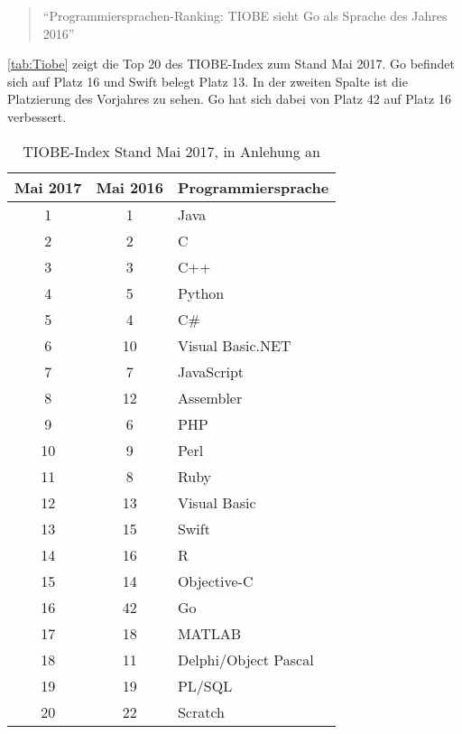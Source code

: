 \begin{quote}
\enquote{Programmiersprachen-Ranking: TIOBE sieht Go als Sprache des Jahres 2016}\cite{MengeSonnentag}
\end{quote}

\autoref{tab:Tiobe} zeigt die Top 20 des TIOBE-Index zum Stand Mai 2017. 
Go befindet sich auf Platz 16 und Swift belegt Platz 13. 
In der zweiten Spalte ist die Platzierung des Vorjahres zu sehen. 
Go hat sich dabei von Platz 42 auf Platz 16 verbessert.

\begin{table}[H]
    \centering
    \begin{tabularx}{\textwidth}{|c|c|X|}
    \hline 
    \rowcolor[gray]{0.75} \textbf{Mai 2017} & \textbf{Mai 2016} & \textbf{Programmiersprache} \\
    \hline
    1 & 1 & Java \\
    \hline
    2 & 2 & C \\
    \hline
    3 & 3 & C++ \\
    \hline
    4 & 5 & Python \\
    \hline
    5 & 4 & C\# \\
    \hline
    6 & 10 & Visual Basic.NET \\
    \hline
    7 & 7 & JavaScript \\
    \hline
    8 & 12 & Assembler \\
    \hline
    9 & 6 & PHP \\
    \hline
    10 & 9 & Perl \\
    \hline
    11 & 8 & Ruby \\
    \hline
    12 & 13 & Visual Basic \\
    \hline
    \rowcolor[gray]{0.9} 13 & 15 & Swift \\
    \hline
    14 & 16 & R \\
    \hline
    15 & 14 & Objective-C \\
    \hline
    \rowcolor[gray]{0.9} 16 & 42 & Go \\
    \hline
    17 & 18 & MATLAB \\	
    \hline
    18 & 11 & Delphi/Object Pascal \\	
    \hline
    19 & 19 & PL/SQL \\	
    \hline
    20 & 22 & Scratch \\	
    \hline
    \end{tabularx}
    \caption{TIOBE-Index Stand Mai 2017, in Anlehung an \cite{Tiobe}}
    \label{tab:Tiobe}
\end{table}

